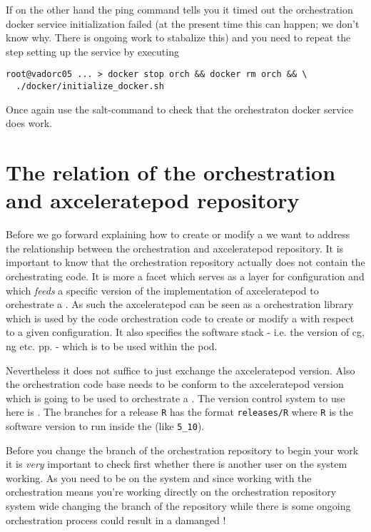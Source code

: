            If on the other hand the ping command tells you it timed out the orchestration docker service initialization failed (at the present time this can happen; we don't know why. There is ongoing work to stabalize this) and you need to repeat the step setting up the service by executing
           \begin{verbatim}
root@vadorc05 ... > docker stop orch && docker rm orch && \
  ./docker/initialize_docker.sh
           \end{verbatim}
           Once again use the salt-command to check that the orchestraton docker service does work.

	\section{The relation of the orchestration and axceleratepod repository}
	Before we go forward explaining how to create or modify a \pod{} we want to address the relationship between the orchestration and axceleratepod repository. It is important to know that the orchestration repository actually does not contain the orchestrating code. It is more a facet which serves as a layer for configuration and which \emph{feeds} a specific version of the implementation of axceleratepod to orchestrate a \pod{}. As such the axceleratepod can be seen as a orchestration library which is used by the code orchestration code to create or modify a \pod{} with respect to a given configuration. It also specifies the software stack - i.e. the version of cg, ng etc. pp. - which is to be used within the pod.
	
	Nevertheless it does not suffice to just exchange the axceleratepod version. Also the orchestration code base needs to be conform to the axceleratepod version which is going to be used to orchestrate a \pod{}. The version control system to use here is \git{}. The branches for a release \texttt{R} has the format \texttt{releases/R} where \texttt{R} is the software version to run inside the \pod{} (like \texttt{5_10}).
	
	Before you change the branch of the orchestration repository to begin your work it is \emph{very} important to check first whether there is another user on the system working. As you need to be \rootuser{} on the system and since working with the orchestration means you're working directly on the orchestration repository system wide changing the branch of the repository while there is some ongoing orchestration process could result in a damanged \pod{}!
	
